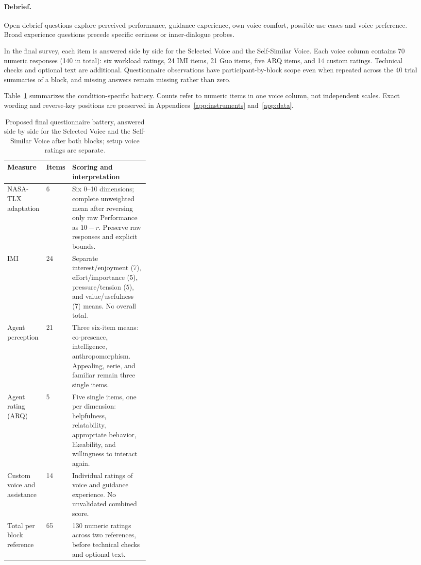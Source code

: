 \paragraph{Debrief.} Open debrief questions explore perceived performance, guidance experience, own-voice comfort, possible use cases and voice preference. Broad experience questions precede specific eeriness or inner-dialogue probes.

In the final survey, each item is answered side by side for the Selected Voice and the Self-Similar Voice. Each voice column contains 70 numeric responses (140 in total): six workload ratings, 24 IMI items, 21 Guo items, five ARQ items, and 14 custom ratings. Technical checks and optional text are additional. Questionnaire observations have participant-by-block scope even when repeated across the 40 trial summaries of a block, and missing answers remain missing rather than zero.


Table~\ref{tab:battery} summarizes the condition-specific battery. Counts refer to numeric items in one voice column, not independent scales. Exact wording and reverse-key positions are preserved in Appendices~\ref{app:instruments} and~\ref{app:data}.
\begin{table}[htbp]
\centering
\caption[Condition-specific questionnaire battery]{Proposed final questionnaire battery, answered side by side for the Selected Voice and the Self-Similar Voice after both blocks; setup voice ratings are separate.}
\label{tab:battery}
\small
{}
\begin{tabularx}{\linewidth}{@{}p{0.25\linewidth}p{0.09\linewidth}X@{}}
\toprule
Measure & Items & Scoring and interpretation \\\midrule
NASA-TLX adaptation & 6 & Six 0--10 dimensions; complete unweighted mean after reversing only raw Performance as $10-r$. Preserve raw responses and explicit bounds. \\
IMI & 24 & Separate interest/enjoyment (7), effort/importance (5), pressure/tension (5), and value/usefulness (7) means. No overall total. \\
Agent perception & 21 & Three six-item means: co-presence, intelligence, anthropomorphism. Appealing, eerie, and familiar remain three single items. \\
Agent rating (ARQ) & 5 & Five single items, one per dimension: helpfulness, relatability, appropriate behavior, likeability, and willingness to interact again. \\
Custom voice and assistance & 14 & Individual ratings of voice and guidance experience. No unvalidated combined score. \\\midrule
Total per block reference & 65 & 130 numeric ratings across two references, before technical checks and optional text. \\\bottomrule
\end{tabularx}
\end{table}

